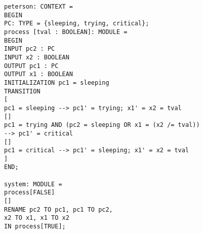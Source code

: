 
\vfill

\begin{figure}[ht]
\begin{minipage}[t]{0.3\linewidth}
\end{minipage}
\begin{minipage}[t]{0.69\linewidth}
{
\scriptsize
\begin{verbatim}
peterson: CONTEXT =
BEGIN
PC: TYPE = {sleeping, trying, critical};
process [tval : BOOLEAN]: MODULE =
BEGIN
INPUT pc2 : PC
INPUT x2 : BOOLEAN
OUTPUT pc1 : PC
OUTPUT x1 : BOOLEAN
INITIALIZATION pc1 = sleeping
TRANSITION
[
pc1 = sleeping --> pc1' = trying; x1' = x2 = tval
[]
pc1 = trying AND (pc2 = sleeping OR x1 = (x2 /= tval))
--> pc1' = critical
[]
pc1 = critical --> pc1' = sleeping; x1' = x2 = tval
]
END;

system: MODULE =
process[FALSE]
[]
RENAME pc2 TO pc1, pc1 TO pc2,
x2 TO x1, x1 TO x2
IN process[TRUE];
\end{verbatim}
}
\end{minipage}
\end{figure}

\vfill

%

